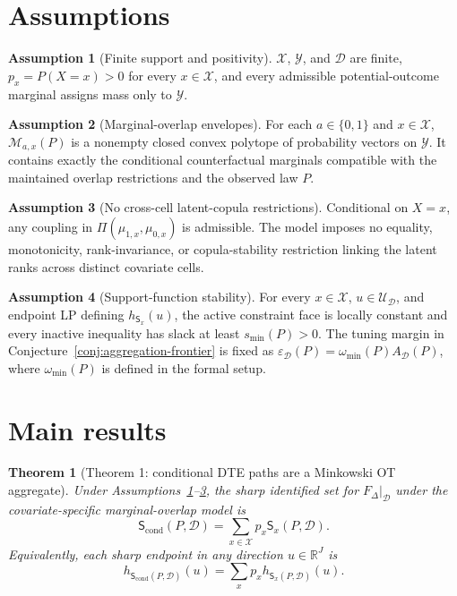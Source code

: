 \documentclass[11pt]{article}
\newcommand{\R}{\mathbb{R}}
\theoremstyle{definition}
\newtheorem{assumption}{Assumption}
\theoremstyle{plain}
\newtheorem{theorem}{Theorem}
\theoremstyle{remark}
\begin{document}
\section{Assumptions}
\begin{assumption}[Finite support and positivity]\label{ass:finite}
\(\mathcal X\), \(\mathcal Y\), and \(\mathcal D\) are finite, \(p_x=P(X=x)>0\) for every \(x\in\mathcal X\), and every admissible potential-outcome marginal assigns mass only to \(\mathcal Y\).
\end{assumption}

\begin{assumption}[Marginal-overlap envelopes]\label{ass:envelopes}
For each \(a\in\{0,1\}\) and \(x\in\mathcal X\), \(\mathcal M_{a,x}(P)\) is a nonempty closed convex polytope of probability vectors on \(\mathcal Y\).  It contains exactly the conditional counterfactual marginals compatible with the maintained overlap restrictions and the observed law \(P\).
\end{assumption}

\begin{assumption}[No cross-cell latent-copula restrictions]\label{ass:no-cross-copula}
Conditional on \(X=x\), any coupling in \(\Pi(\mu_{1,x},\mu_{0,x})\) is admissible.  The model imposes no equality, monotonicity, rank-invariance, or copula-stability restriction linking the latent ranks across distinct covariate cells.
\end{assumption}

\begin{assumption}[Support-function stability]\label{ass:stability}
For every \(x\in\mathcal X\), \(u\in\mathcal U_{\mathcal D}\), and endpoint LP defining \(h_{\mathsf S_x}(u)\), the active constraint face is locally constant and every inactive inequality has slack at least \(s_{\min}(P)>0\).  The tuning margin in Conjecture~\ref{conj:aggregation-frontier} is fixed as \(\varepsilon_{\mathcal D}(P)=\omega_{\min}(P)A_{\mathcal D}(P)\), where \(\omega_{\min}(P)\) is defined in the formal setup.
\end{assumption}

\section{Main results}
\begin{theorem}[Theorem 1: conditional DTE paths are a Minkowski OT aggregate]\label{thm:conditional-minkowski}
Under Assumptions~\ref{ass:finite}--\ref{ass:no-cross-copula}, the sharp identified set for \(F_\Delta|_{\mathcal D}\) under the covariate-specific marginal-overlap model is
\[
\mathsf S_{\mathrm{cond}}(P,\mathcal D)=
\sum_{x\in\mathcal X}p_x\mathsf S_x(P,\mathcal D).
\]
Equivalently, each sharp endpoint in any direction \(u\in\R^J\) is
\[
h_{\mathsf S_{\mathrm{cond}}(P,\mathcal D)}(u)
=\sum_x p_x h_{\mathsf S_x(P,\mathcal D)}(u).
\]
\end{theorem}
\end{document}
